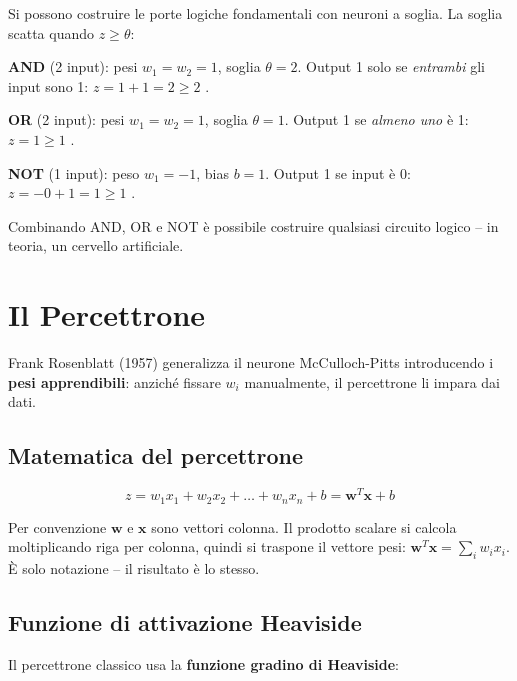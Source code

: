 \begin{exbox}
Si possono costruire le porte logiche fondamentali con neuroni a soglia. La soglia scatta quando $z \geq \theta$:

\textbf{AND} (2 input): pesi $w_1 = w_2 = 1$, soglia $\theta = 2$. Output 1 solo se \emph{entrambi} gli input sono 1: $z = 1+1 = 2 \geq 2$ {\checkmark}.

\textbf{OR} (2 input): pesi $w_1 = w_2 = 1$, soglia $\theta = 1$. Output 1 se \emph{almeno uno} è 1: $z = 1 \geq 1$ {\checkmark}.

\textbf{NOT} (1 input): peso $w_1 = -1$, bias $b = 1$. Output 1 se input è 0: $z = -0 + 1 = 1 \geq 1$ {\checkmark}.

Combinando AND, OR e NOT è possibile costruire qualsiasi circuito logico -- in teoria, un cervello artificiale.
\end{exbox}

\section{Il Percettrone}

Frank Rosenblatt (1957) generalizza il neurone McCulloch-Pitts introducendo i \textbf{pesi apprendibili}: anziché fissare $w_i$ manualmente, il percettrone li impara dai dati.

\subsection{Matematica del percettrone}

\begin{equation}
z = w_1 x_1 + w_2 x_2 + \dots + w_n x_n + b = \mathbf{w}^T \mathbf{x} + b
\end{equation}

\begin{notebox}
Per convenzione $\mathbf{w}$ e $\mathbf{x}$ sono vettori colonna. Il prodotto scalare si calcola moltiplicando riga per colonna, quindi si traspone il vettore pesi: $\mathbf{w}^T \mathbf{x} = \sum_i w_i x_i$. È solo notazione -- il risultato è lo stesso.
\end{notebox}

\subsection{Funzione di attivazione Heaviside}

Il percettrone classico usa la \textbf{funzione gradino di Heaviside}:


